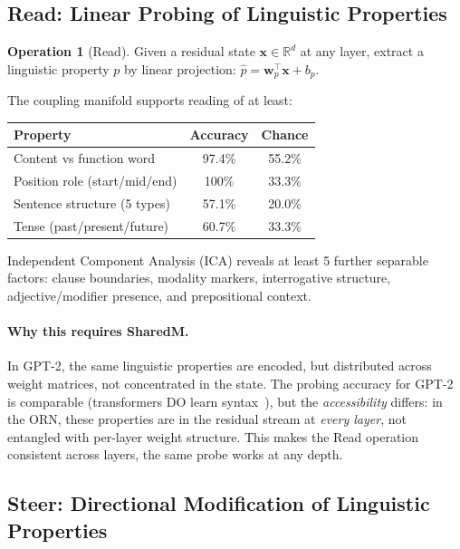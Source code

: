 \documentclass[11pt, a4paper]{article}
\newcommand{\x}{\mathbf{x}}
\newcommand{\R}{\mathbb{R}}
\theoremstyle{plain}
\theoremstyle{definition}
\newtheorem{operation}{Operation}
\theoremstyle{remark}
\begin{document}
\subsection{Read: Linear Probing of Linguistic Properties}

\begin{operation}[Read]
Given a residual state $\x \in \R^d$ at any layer, extract a linguistic property $p$ by linear projection: $\hat{p} = \mathbf{w}_p^\top \x + b_p$.
\end{operation}

The coupling manifold supports reading of at least:
\begin{center}\small
\begin{tabular}{lcc}
\toprule
\textbf{Property} & \textbf{Accuracy} & \textbf{Chance} \\
\midrule
Content vs function word & 97.4\% & 55.2\% \\
Position role (start/mid/end) & 100\% & 33.3\% \\
Sentence structure (5 types) & 57.1\% & 20.0\% \\
Tense (past/present/future) & 60.7\% & 33.3\% \\
\bottomrule
\end{tabular}
\end{center}

Independent Component Analysis (ICA) reveals at least 5 further separable factors: clause boundaries, modality markers, interrogative structure, adjective/modifier presence, and prepositional context.

\paragraph{Why this requires SharedM.}
In GPT-2, the same linguistic properties are encoded, but distributed across weight matrices, not concentrated in the state.
The probing accuracy for GPT-2 is comparable (transformers DO learn syntax~\cite{hewitt2019probe}), but the \emph{accessibility} differs: in the ORN, these properties are in the residual stream at \emph{every layer}, not entangled with per-layer weight structure.
This makes the Read operation consistent across layers, the same probe works at any depth.

\subsection{Steer: Directional Modification of Linguistic Properties}
\end{document}
